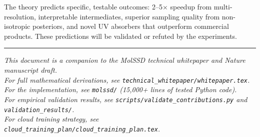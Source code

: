 \documentclass[12pt,a4paper]{article}
\begin{document}
The theory predicts specific, testable outcomes: 2--5$\times$ speedup from multi-resolution, interpretable intermediates, superior sampling quality from non-isotropic posteriors, and novel UV absorbers that outperform commercial products. These predictions will be validated or refuted by the experiments.


\vspace{1cm}
\noindent\rule{\textwidth}{0.5pt}
\begin{center}
\small\textit{This document is a companion to the MolSSD technical whitepaper and Nature manuscript draft.\\
For full mathematical derivations, see \texttt{technical\_whitepaper/whitepaper.tex}.\\
For the implementation, see \texttt{molssd/} (15,000+ lines of tested Python code).\\
For empirical validation results, see \texttt{scripts/validate\_contributions.py} and \texttt{validation\_results/}.\\
For cloud training strategy, see \texttt{cloud\_training\_plan/cloud\_training\_plan.tex}.}
\end{center}
\end{document}
